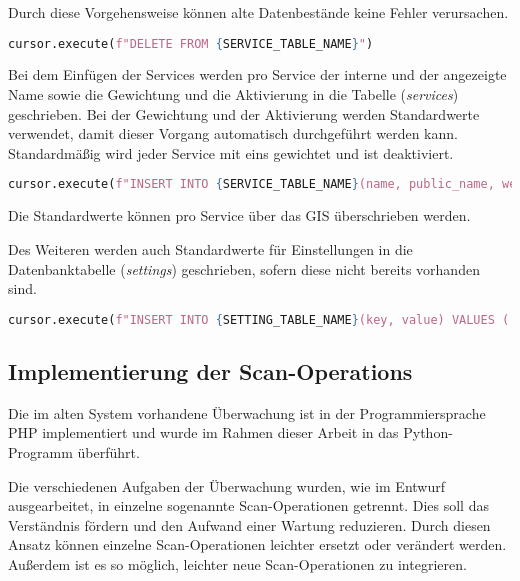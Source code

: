 Durch diese Vorgehensweise können alte Datenbestände keine Fehler verursachen.

\begin{lstlisting}[language=Python, frame=single, caption={Löschen der Services}, captionpos=b, label={lst:bigbrother-delete-service}]
cursor.execute(f"DELETE FROM {SERVICE_TABLE_NAME}")	
\end{lstlisting}

Bei dem Einfügen der Services werden pro Service der interne und der angezeigte Name sowie die Gewichtung und die Aktivierung in die Tabelle (\textit{services}) geschrieben. Bei der Gewichtung und der Aktivierung werden Standardwerte verwendet, damit dieser Vorgang automatisch durchgeführt werden kann. Standardmäßig wird jeder Service mit eins gewichtet und ist deaktiviert.

\begin{lstlisting}[language=Python, frame=single, caption={Einfügen eines Services}, captionpos=b, label={lst:bigbrother-create-service}]
cursor.execute(f"INSERT INTO {SERVICE_TABLE_NAME}(name, public_name, weight, active) VALUES ('{name}', '{public_name}', 1, FALSE);")
\end{lstlisting}

Die Standardwerte können pro Service über das GIS überschrieben werden.

Des Weiteren werden auch Standardwerte für Einstellungen in die Datenbanktabelle (\textit{settings}) geschrieben, sofern diese nicht bereits vorhanden sind.

\begin{lstlisting}[language=Python, frame=single, caption={Einfügen einer Einstellung}, captionpos=b, label={lst:bigbrother-create-settings}]
cursor.execute(f"INSERT INTO {SETTING_TABLE_NAME}(key, value) VALUES ('{default_value[0]}', '{default_value[1]}') ON CONFLICT (key) DO NOTHING;")
\end{lstlisting}


\subsection{Implementierung der Scan-Operations}
Die im alten System vorhandene Überwachung ist in der Programmiersprache PHP implementiert und wurde im Rahmen dieser Arbeit in das Python-Programm überführt.

Die verschiedenen Aufgaben der Überwachung wurden, wie im Entwurf ausgearbeitet, in einzelne sogenannte Scan-Operationen getrennt. Dies soll das Verständnis fördern und den Aufwand einer Wartung reduzieren. Durch diesen Ansatz können einzelne Scan-Operationen leichter ersetzt oder verändert werden. Außerdem ist es so möglich, leichter neue \linebreak Scan-Operationen zu integrieren.

